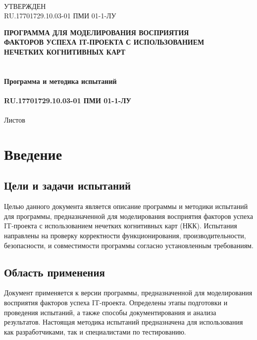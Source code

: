\documentclass{article}
\begin{document}
    \newpage
    \clearpage
    \begin{textbf}
        \\
        УТВЕРЖДЕН\\
        RU.17701729.10.03-01 ПМИ 01-1-ЛУ\\
    \end{textbf}
    \bigskip
    \begin{center}
        \topskip=0pt
        \vspace*{\fill}
        \textbf{ПРОГРАММА ДЛЯ МОДЕЛИРОВАНИЯ ВОСПРИЯТИЯ\\
        ФАКТОРОВ УСПЕХА IТ-ПРОЕКТА С ИСПОЛЬЗОВАНИЕМ\\
        НЕЧЕТКИХ КОГНИТИВНЫХ КАРТ\\
        ~\\
        ~\\
        Программа и методика испытаний\\
        ~\\
        RU.17701729.10.03-01 ПМИ 01-1-ЛУ}\\
        ~\\
        Листов \ztotpages\\
        \vspace*{\fill}
    \end{center}
    \begin{center}
    \end{center}
    \newpage
    \tableofcontents
    \newpage
    \section{Введение}

    \subsection{Цели и задачи испытаний}
    Целью данного документа является описание программы и методики испытаний для программы, предназначенной для моделирования восприятия факторов успеха IT-проекта с использованием нечетких когнитивных карт (НКК). Испытания направлены на проверку корректности функционирования, производительности, безопасности, и совместимости программы согласно установленным требованиям.

    \subsection{Область применения}
    Документ применяется к версии программы, предназначенной для моделирования восприятия факторов успеха IT-проекта. Определены этапы подготовки и проведения испытаний, а также способы документирования и анализа результатов. Настоящая методика испытаний предназначена для использования как разработчиками, так и специалистами по тестированию.
\end{document}
